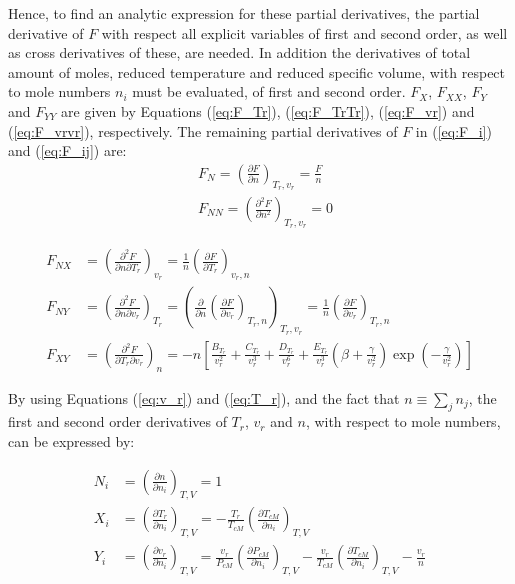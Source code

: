 \documentclass[english]{../thermomemo/thermomemo}
\numberwithin{equation}{section}
\newcommand*{\pder}[2]{\left(\frac{\partial #1}{\partial #2}\right)}
\newcommand*{\pdder}[2]{\left(\frac{\partial^2 #1}{\partial #2^2}\right)}
\newcommand*{\pdcross}[3]{\left(\frac{\partial^2 #1}{\partial #2 \partial #3}\right)}
\newcommand*{\reff}[1]{(\ref{#1})}
\begin{document}
Hence, to find an analytic expression for these partial derivatives, the partial derivative of $F$ with respect all explicit variables of first and second order, as well as cross derivatives of these, are needed. In addition the derivatives of total amount of moles, reduced temperature and reduced specific volume, with respect to mole numbers $n_i$ must be evaluated, of first and second order. $F_X$, $F_{XX}$, $F_Y$ and $F_{YY}$ are given by Equations \reff{eq:F_Tr}, \reff{eq:F_TrTr}, \reff{eq:F_vr} and \reff{eq:F_vrvr}, respectively. The remaining partial derivatives of $F$ in \reff{eq:F_i} and \reff{eq:F_ij} are:
\begin{align}
\label{eq:F_n}
& F_N = \pder{F}{n}_{T_r, v_r} = \frac{F}{n} \\
& F_{NN}  = \pdder{F}{n}_{T_r,v_r} = 0
\end{align}

\begin{align}
\label{eq:F_nTr}
F_{NX} & = \pdcross{F}{n}{T_r}_{v_r} = \frac{1}{n} \pder{F}{T_r}_{v_r,n}\\
\label{eq:F_nvr}
F_{NY} & =  \pdcross{F}{n}{v_r}_{T_r} = \left(\frac{\partial}{\partial n} \pder{F}{v_r}_{T_r,n} \right)_{T_r, v_r} = \frac{1}{n} \pder{F}{v_r}_{T_r,n} \\
\label{eq:F_vrTr}
F_{X Y} & = \pdcross{F}{T_r}{v_r}_{n} = - n \left[ \frac{B_{T_r}}{v_r^2} + \frac{C_{T_r}}{v_r^3} + \frac{D_{T_r}}{v_r^6} + \frac{E_{T_r}}{v_r^3} \left( \beta + \frac{\gamma}{v_r^2} \right)\exp \left(-\frac{\gamma}{v_r^2} \right) \right]
\end{align}

By using Equations \reff{eq:v_r} and \reff{eq:T_r}, and the fact that $n \equiv \sum_j n_j$, the first and second order derivatives of $T_r$, $v_r$ and $n$, with respect to mole numbers, can be expressed by:

\begin{align}
 N_i & = \left(\frac{\partial n}{\partial n_i} \right)_{T,V} = 1 \label{eq:n_ni} \\
 X_i & = \left(\frac{\partial T_r}{\partial n_i} \right)_{T,V} = -\frac{T_r}{T_{cM}} \left(\frac{\partial T_{cM}}{\partial n_i} \right)_{T,V} \label{eq:Tr_ni} \\
 Y_i & = \left(\frac{\partial v_r}{\partial n_i} \right)_{T,V} = \frac{v_r}{P_{cM}} \left(\frac{\partial P_{cM}}{\partial n_i} \right)_{T,V} - \frac{v_r}{T_{cM}} \left( \frac{\partial T_{cM}}{\partial n_i} \right)_{T,V} -\frac{v_r}{n}\label{eq:vr_ni}
\end{align}
\end{document}
